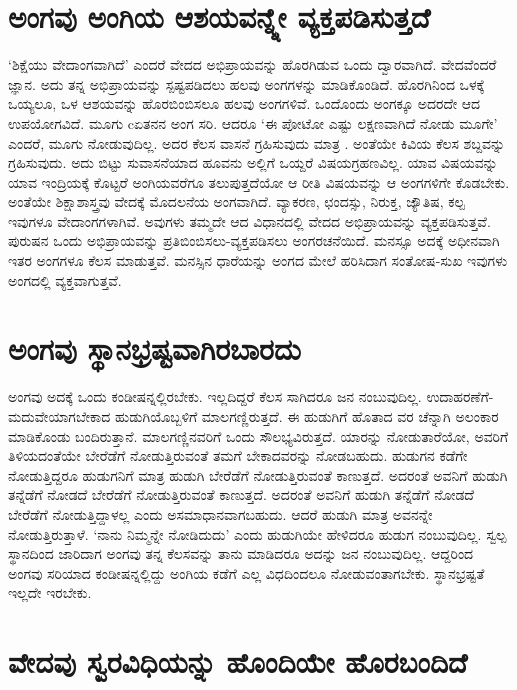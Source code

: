 \section*{ಅಂಗವು ಅಂಗಿಯ ಆಶಯವನ್ನ್ನೇ ವ್ಯಕ್ತಪಡಿಸುತ್ತದೆ}

`ಶಿಕ್ಷೆಯು ವೇದಾಂಗವಾಗಿದೆ' ಎಂದರೆ ವೇದದ ಅಭಿಪ್ರಾಯವನ್ನು  ಹೊರಗಿಡುವ ಒಂದು ದ್ವಾರವಾಗಿದೆ. ವೇದವೆಂದರೆ  ಜ್ಞಾನ. ಅದು ತನ್ನ ಅಭಿಪ್ರಾಯವನ್ನು  ಸ್ಪಷ್ಟಪಡಿದಲು ಹಲವು ಅಂಗಗಳನ್ನು ಮಾಡಿಕೊಂಡಿದೆ. ಹೊರಗಿನಿಂದ ಒಳಕ್ಕೆ  ಒಯ್ಯಲೂ, ಒಳ ಆಶಯವನ್ನು  ಹೊರಬಿಂಬಿಸಲೂ ಹಲವು ಅಂಗಗಳಿವೆ. ಒಂದೊಂದು  ಅಂಗಕ್ಕೂ ಅದರದೇ ಆದ ಉಪಯೋಗವಿದೆ. ಮೂಗು cಏತನನ ಅಂಗ ಸರಿ. ಆದರೂ `ಈ ಪೋಟೋ ಎಷ್ಟು ಲಕ್ಷಣವಾಗಿದೆ ನೋಡು ಮೂಗೇ' ಎಂದರೆ, ಮೂಗು ನೋಡುವುದಿಲ್ಲ. ಅದರ ಕೆಲಸ ವಾಸನೆ ಗ್ರಹಿಸುವುದು ಮಾತ್ರ . ಅಂತೆಯೇ ಕಿವಿಯ ಕೆಲಸ ಶಬ್ದವನ್ನು ಗ್ರಹಿಸುವುದು. ಅದು ಬಿಟ್ಟು ಸುವಾಸನೆಯಾದ ಹೂವನು ಅಲ್ಲಿಗೆ ಒಯ್ದರೆ ವಿಷಯಗ್ರಹಣವಿಲ್ಲ. ಯಾವ ವಿಷಯವನ್ನು  ಯಾವ ಇಂದ್ರಿಯಕ್ಕೆ  ಕೊಟ್ಟರೆ ಅಂಗಿಯವರೆಗೂ ತಲುಪುತ್ತದೆಯೋ ಆ ರೀತಿ ವಿಷಯವನ್ನು  ಆ ಅಂಗಗಳಿಗೇ ಕೊಡಬೇಕು. ಅಂತೆಯೇ ಶಿಕ್ಷಾಶಾಸ್ತ್ರವು ವೇದಕ್ಕೆ  ಮೊದಲನೆಯ ಅಂಗವಾಗಿದೆ. ವ್ಯಾಕರಣ, ಛಂದಸ್ಸು, ನಿರುಕ್ತ, ಜ್ಯೌತಿಷ, ಕಲ್ಪ ಇವುಗಳೂ ವೇದಾಂಗಗಳಾಗಿವೆ. ಅವುಗಳು ತಮ್ಮದೇ ಆದ ವಿಧಾನದಲ್ಲಿ ವೇದದ ಅಭಿಪ್ರಾಯವನ್ನು  ವ್ಯಕ್ತಪಡಿಸುತ್ತವೆ. ಪುರುಷನ ಒಂದು ಅಭಿಪ್ರಾಯವನ್ನು ಪ್ರತಿಬಿಂಬಿಸಲು-ವ್ಯಕ್ತಪಡಿಸಲು ಅಂಗರಚನೆಯಿದೆ. ಮನಸ್ಸೂ  ಅದಕ್ಕೆ  ಅಧೀನವಾಗಿ ಇತರ ಅಂಗಗಳೂ ಕೆಲಸ ಮಾಡುತ್ತವೆ. ಮನಸ್ಸಿನ ಧಾರೆಯನ್ನು  ಅಂಗದ ಮೇಲೆ ಹರಿಸಿದಾಗ ಸಂತೋಷ-ಸುಖ ಇವುಗಳು ಅಂಗದಲ್ಲಿ ವ್ಯಕ್ತವಾಗುತ್ತವೆ. 

\section*{ಅಂಗವು ಸ್ಥಾನಭ್ರಷ್ಟವಾಗಿರಬಾರದು}

ಅಂಗವು ಅದಕ್ಕೆ  ಒಂದು ಕಂಡೀಷನ್ನಲ್ಲಿರಬೇಕು. ಇಲ್ಲದಿದ್ದರೆ ಕೆಲಸ ಸಾಗಿದರೂ ಜನ ನಂಬುವುದಿಲ್ಲ. ಉದಾಹರಣೆಗೆ- ಮದುವೇಯಾಗಬೇಕಾದ ಹುಡುಗಿಯೊಬ್ಬಳಿಗೆ ಮಾಲಗಣ್ಣಿರುತ್ತದೆ. ಈ ಹುಡುಗಿಗೆ ಹೊತಾದ ವರ ಚೆನ್ನಾಗಿ ಅಲಂಕಾರ ಮಾಡಿಕೊಂಡು ಬಂದಿರುತ್ತಾನೆ. ಮಾಲಗಣ್ಣಿನವರಿಗೆ ಒಂದು ಸೌಲಭ್ಯವಿರುತ್ತದೆ. ಯಾರನ್ನು  ನೋಡುತಾರೆಯೋ, ಅವರಿಗೆ ತಿಳಿಯದಂತೆಯೇ ಬೇರೆಡೆಗೆ ನೋಡುತ್ತಿರುವಂತೆ ತಮಗೆ ಬೇಕಾದವರನ್ನು  ನೋಡಬಹುದು. ಹುಡುಗನ ಕಡೆಗೇ ನೋಡುತ್ತಿದ್ದರೂ ಹುಡುಗನಿಗೆ  ಮಾತ್ರ ಹುಡುಗಿ ಬೇರೆಡೆಗೆ ನೋಡುತ್ತಿರುವಂತೆ ಕಾಣುತ್ತದೆ. ಅದರಂತೆ ಅವನಿಗೆ ಹುಡುಗಿ ತನ್ನೆಡೆಗೆ ನೋಡದೆ ಬೇರೆಡೆಗೆ ನೋಡುತ್ತಿರುವಂತೆ ಕಾಣುತ್ತದೆ. ಅದರಂತೆ ಅವನಿಗೆ ಹುಡುಗಿ ತನ್ನೆಡೆಗೆ ನೋಡದೆ ಬೇರೆಡೆಗೆ ನೋಡುತ್ತಿದ್ದಾಳಲ್ಲ ಎಂದು ಅಸಮಾಧಾನವಾಗಬಹುದು. ಆದರೆ ಹುಡುಗಿ ಮಾತ್ರ ಅವನನ್ನೇ ನೋಡುತ್ತಿರುತ್ತಾಳೆ. `ನಾನು ನಿಮ್ಮನ್ನೇ ನೋಡಿದುದು' ಎಂದು ಹುಡುಗಿಯೇ ಹೇಳಿದರೂ ಹುಡುಗ  ನಂಬುವುದಿಲ್ಲ. ಸ್ವಲ್ಪ ಸ್ಥಾನದಿಂದ ಜಾರಿದಾಗ ಅಂಗವು ತನ್ನ ಕೆಲಸವನ್ನು  ತಾನು ಮಾಡಿದರೂ ಅದನ್ನು  ಜನ ನಂಬುವುದಿಲ್ಲ. ಆದ್ದರಿಂದ ಅಂಗವು ಸರಿಯಾದ ಕಂಡೀಷನ್ನಲ್ಲಿದ್ದು ಅಂಗಿಯ ಕಡೆಗೆ ಎಲ್ಲ ವಿಧದಿಂದಲೂ ನೋಡುವಂತಾಗಬೇಕು. ಸ್ಥಾನಭ್ರಷ್ಟತೆ ಇಲ್ಲದೇ ಇರಬೇಕು.

\section*{ವೇದವು ಸ್ವರವಿಧಿಯನ್ನು  ಹೊಂದಿಯೇ ಹೊರಬಂದಿದೆ}

